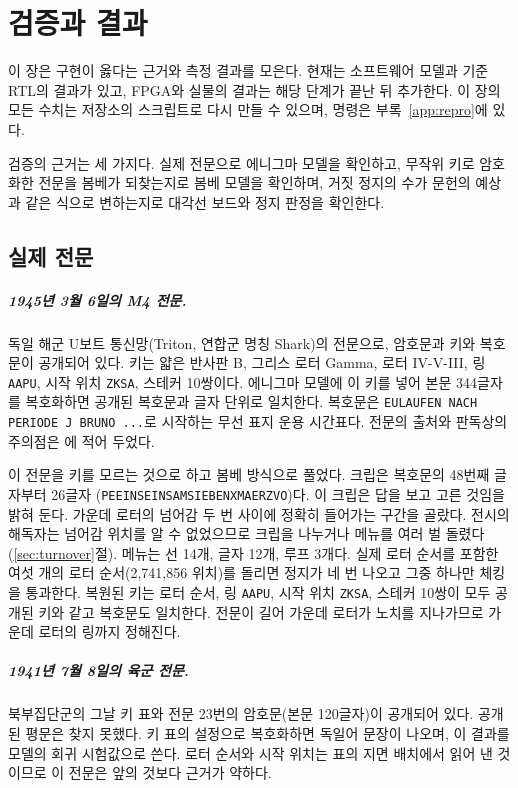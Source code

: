\chapter{검증과 결과}\label{ch:results}

이 장은 구현이 옳다는 근거와 측정 결과를 모은다. 현재는 소프트웨어 모델과 기준 RTL의 결과가 있고,
FPGA와 실물의 결과는 해당 단계가 끝난 뒤 추가한다. 이 장의 모든 수치는 저장소의 스크립트로 다시 만들 수
있으며, 명령은 부록~\ref{app:repro}에 있다.

검증의 근거는 세 가지다. 실제 전문으로 에니그마 모델을 확인하고, 무작위 키로 암호화한 전문을 봄베가
되찾는지로 봄베 모델을 확인하며, 거짓 정지의 수가 문헌의 예상과 같은 식으로 변하는지로 대각선 보드와
정지 판정을 확인한다.

\section{실제 전문}\label{sec:historical}

\paragraph{1945년 3월 6일의 M4 전문.} 독일 해군 U보트 통신망(Triton, 연합군 명칭 Shark)의 전문으로,
암호문과 키와 복호문이 공개되어 있다. 키는 얇은 반사판 B, 그리스 로터 Gamma, 로터 IV-V-III, 링
\texttt{AAPU}, 시작 위치 \texttt{ZKSA}, 스테커 10쌍이다. 에니그마 모델에 이 키를 넣어 본문 344글자를
복호화하면 공개된 복호문과 글자 단위로 일치한다. 복호문은 \texttt{EULAUFEN NACH PERIODE J BRUNO ...}로
시작하는 무선 표지 운용 시간표다. 전문의 출처와 판독상의 주의점은 에
적어 두었다.

이 전문을 키를 모르는 것으로 하고 봄베 방식으로 풀었다. 크립은 복호문의 48번째 글자부터 26글자
(\texttt{PEEINSEINSAMSIEBENXMAERZVO})다. 이 크립은 답을 보고 고른 것임을 밝혀 둔다. 가운데 로터의 넘어감
두 번 사이에 정확히 들어가는 구간을 골랐다. 전시의 해독자는 넘어감 위치를 알 수 없었으므로 크립을
나누거나 메뉴를 여러 벌 돌렸다(\ref{sec:turnover}절). 메뉴는 선 14개, 글자 12개, 루프 3개다. 실제 로터
순서를 포함한 여섯 개의 로터 순서(2,741,856 위치)를 돌리면 정지가 네 번 나오고 그중 하나만 체킹을
통과한다. 복원된 키는 로터 순서, 링 \texttt{AAPU}, 시작 위치 \texttt{ZKSA}, 스테커 10쌍이 모두 공개된
키와 같고 복호문도 일치한다. 전문이 길어 가운데 로터가 노치를 지나가므로 가운데 로터의 링까지 정해진다.

\paragraph{1941년 7월 8일의 육군 전문.} 북부집단군의 그날 키 표와 전문 23번의 암호문(본문 120글자)이
공개되어 있다. 공개된 평문은 찾지 못했다. 키 표의 설정으로 복호화하면 독일어 문장이 나오며, 이 결과를
모델의 회귀 시험값으로 쓴다. 로터 순서와 시작 위치는 표의 지면 배치에서 읽어 낸 것이므로 이 전문은
앞의 것보다 근거가 약하다.

